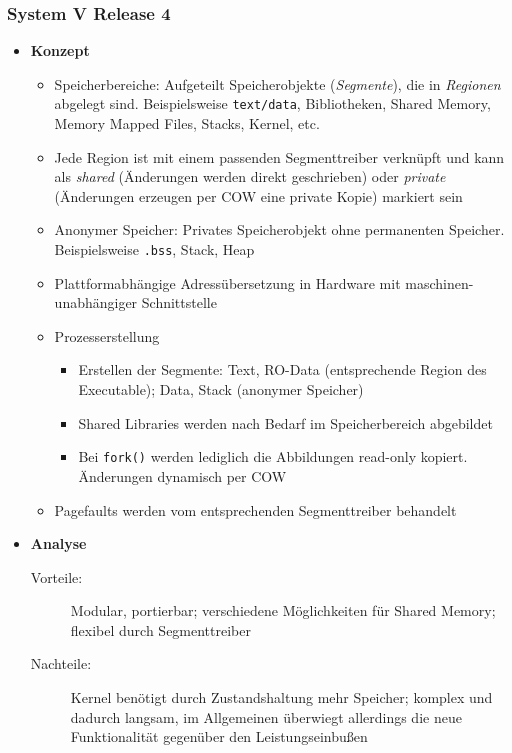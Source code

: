 \subsubsection{System V Release 4}
\begin{itemize}
	\item \textbf{Konzept}
	\begin{itemize}
		\item Speicherbereiche: Aufgeteilt Speicherobjekte (\textit{Segmente}), die in \textit{Regionen} abgelegt sind. Beispielsweise \texttt{text/data}, Bibliotheken, Shared Memory, Memory Mapped Files, Stacks, Kernel, etc.
		\item Jede Region ist mit einem passenden Segmenttreiber verknüpft und kann als \textit{shared} (Änderungen werden direkt geschrieben) oder \textit{private} (Änderungen erzeugen per COW eine private Kopie) markiert sein
		\item Anonymer Speicher: Privates Speicherobjekt ohne permanenten Speicher. Beispielsweise \texttt{.bss}, Stack, Heap
		\item Plattformabhängige Adressübersetzung in Hardware mit maschinen-unabhängiger Schnittstelle
		\item Prozesserstellung
		\begin{itemize}
			\item Erstellen der Segmente: Text, RO-Data (entsprechende Region des Executable); Data, Stack (anonymer Speicher)
			\item Shared Libraries werden nach Bedarf im Speicherbereich abgebildet
			\item Bei \texttt{fork()} werden lediglich die Abbildungen read-only kopiert. Änderungen dynamisch per COW
		\end{itemize}
		\item Pagefaults werden vom entsprechenden Segmenttreiber behandelt
	\end{itemize}
	\item \textbf{Analyse}
	\begin{description}
		\item[Vorteile:] Modular, portierbar; verschiedene Möglichkeiten für Shared Memory; flexibel durch Segmenttreiber
		\item[Nachteile:] Kernel benötigt durch Zustandshaltung mehr Speicher; komplex und dadurch langsam, im Allgemeinen überwiegt allerdings die neue Funktionalität gegenüber den Leistungseinbußen
	\end{description}
\end{itemize}

